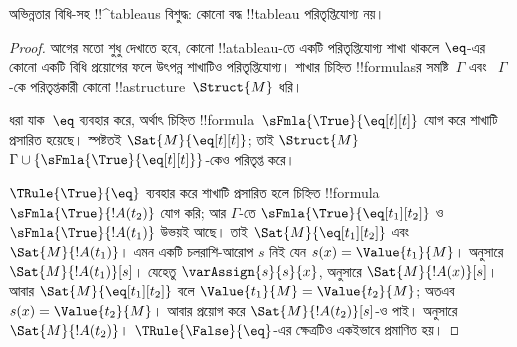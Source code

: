 \documentclass[../../../include/open-logic-section]{subfiles}
\begin{document}


\begin{prop}
অভিন্নতার বিধি-সহ !!^{tableau}s বিশুদ্ধ: কোনো বদ্ধ !!{tableau}
পরিতৃপ্তিযোগ্য নয়।
\end{prop}

\begin{proof}
আগের মতো শুধু দেখাতে হবে, কোনো !!a{tableau}-তে একটি পরিতৃপ্তিযোগ্য
শাখা থাকলে $\eq$-এর কোনো একটি বিধি প্রয়োগের ফলে উৎপন্ন শাখাটিও
পরিতৃপ্তিযোগ্য। শাখার চিহ্নিত !!{formula}sর সমষ্টি~$\Gamma$ এবং
~$\Gamma$-কে পরিতৃপ্তকারী কোনো !!a{structure}~$\Struct{M}$ ধরি।

ধরা যাক~$\eq$ ব্যবহার করে, অর্থাৎ চিহ্নিত
!!{formula}~$\sFmla{\True}{\eq[t][t]}$ যোগ করে শাখাটি প্রসারিত
হয়েছে। স্পষ্টতই $\Sat{M}{\eq[t][t]}$; তাই $\Struct{M}$
$\Gamma \cup \{\sFmla{\True}{\eq[t][t]}\}$-কেও পরিতৃপ্ত করে।

$\TRule{\True}{\eq}$ ব্যবহার করে শাখাটি প্রসারিত হলে চিহ্নিত
!!{formula}~$\sFmla{\True}{!A(t_2)}$ যোগ করি; আর $\Gamma$-তে
$\sFmla{\True}{\eq[t_1][t_2]}$ ও $\sFmla{\True}{!A(t_1)}$ উভয়ই
আছে। তাই $\Sat{M}{\eq[t_1][t_2]}$ এবং
$\Sat{M}{!A(t_1)}$। এমন একটি চলরাশি-আরোপ $s$ নিই যেন
$s(x) = \Value{t_1}{M}$। 
অনুসারে $\Sat{M}{!A(t_1)}[s]$। যেহেতু $\varAssign{s}{s}{x}$,
 অনুসারে
$\Sat{M}{!A(x)}[s]$। আবার $\Sat{M}{\eq[t_1][t_2]}$ বলে
$\Value{t_1}{M} = \Value{t_2}{M}$; অতএব
$s(x) = \Value{t_2}{M}$।  আবার
প্রয়োগ করে $\Sat{M}{!A(t_2)}[s]$-ও পাই।
 অনুসারে
$\Sat{M}{!A(t_2)}$। $\TRule{\False}{\eq}$-এর ক্ষেত্রটিও একইভাবে
প্রমাণিত হয়।
\end{proof}
\end{document}
